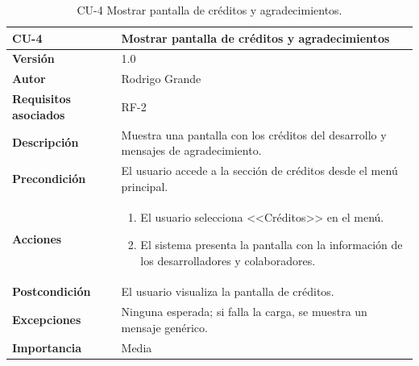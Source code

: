 \begin{table}[p]
	\centering
	\begin{tabularx}{\linewidth}{ p{} p{} }
		\toprule
		\textbf{CU-4} & \textbf{Mostrar pantalla de créditos y agradecimientos}\\
		\toprule
		\textbf{Versión}              & 1.0    \\
		\textbf{Autor}                & Rodrigo Grande \\
		\textbf{Requisitos asociados} & RF-2 \\
		\textbf{Descripción}          & Muestra una pantalla con los créditos del desarrollo y mensajes de agradecimiento.\\
		\textbf{Precondición}         & El usuario accede a la sección de créditos desde el menú principal. \\
		\textbf{Acciones}             &
		\begin{enumerate}
			\def\labelenumi{\arabic{enumi}.}
			\tightlist
			\item El usuario selecciona <<Créditos>> en el menú.
			\item El sistema presenta la pantalla con la información de los desarrolladores y colaboradores.
		\end{enumerate}\\
		\textbf{Postcondición}        & El usuario visualiza la pantalla de créditos. \\
		\textbf{Excepciones}          & Ninguna esperada; si falla la carga, se muestra un mensaje genérico. \\
		\textbf{Importancia}          & Media \\
		\bottomrule
	\end{tabularx}
	\caption{CU-4 Mostrar pantalla de créditos y agradecimientos.}
	\label{cu:creditos}
\end{table}

